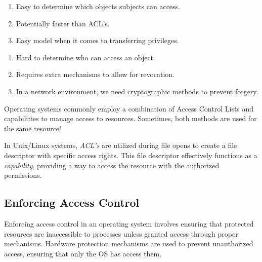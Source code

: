 \documentclass{report}
\newcommand{\exampleBegin}[1]{\begin{tcolorbox}[colback=blue!5!white,colframe=black!75!blue,title={Example:
      #1}]}
\newcommand{\exampleEnd}{\end{tcolorbox}}
\newcommand{\corollaryBegin}[1]{\begin{tcolorbox}[colback=teal!5!white,colframe=black!75!teal,title={Corollary:
      #1}]}
\newcommand{\corollaryEnd}{\end{tcolorbox}}
\begin{document}
\begin{tcbraster}[raster columns=2, raster equal height, raster force size=false]
  \begin{tcolorbox}[colback=green!5!white,colframe=black!75!green,title=Advantages]
    \begin{enumerate}[label=\textit{(\roman*)}]
    \item Easy to determine which objects subjects can access.
    \item Potentially faster than ACL's.
    \item Easy model when it comes to transferring privileges.
    \end{enumerate}
  \end{tcolorbox}
  \begin{tcolorbox}[colback=red!5!white,colframe=black!40!red,title=Disadvantages]
    \begin{enumerate}[label=\textit{(\roman*)}]
    \item Hard to determine who can access an object.
    \item Requires extra mechanisms to allow for revocation.
    \item In a network environment, we need cryptographic methods to prevent forgery.
    \end{enumerate}
  \end{tcolorbox}
\end{tcbraster}


\corollaryBegin{OS Use}
Operating systems commonly employ a combination of Access Control Lists and capabilities to
manage access to resources. Sometimes, both methods are used for the same resource!

\exampleBegin{Files}
In Unix/Linux systems, \textit{ACL's} are utilized during file opens to create a file descriptor
with specific access rights. This file descriptor effectively functions as a \textit{capability},
providing a way to access the resource with the authorized permissions.
\exampleEnd
\corollaryEnd

\subsection{Enforcing Access Control}
Enforcing access control in an operating system involves ensuring that protected resources are
inaccessible to processes unless granted access through proper mechanisms. Hardware protection
mechanisms are used to prevent unauthorized access, ensuring that only the OS has access them.
\end{document}
